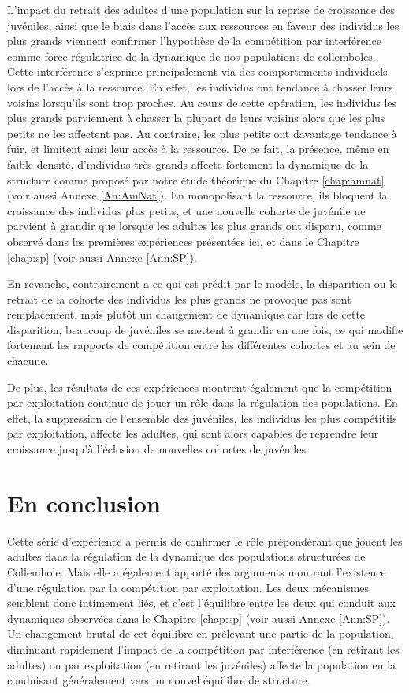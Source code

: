 L'impact du retrait des adultes d'une population sur la reprise de croissance
des juvéniles, ainsi que le biais dans l'accès aux ressources en faveur des
individus les plus grands viennent confirmer l'hypothèse de la compétition par
interférence comme force régulatrice de la dynamique de nos populations de
collemboles. Cette interférence s'exprime principalement via des comportements
individuels lors de l'accès à la ressource. En effet, les individus ont tendance
à chasser leurs voisins lorsqu'ils sont trop proches. Au cours de cette
opération, les individus les plus grands parviennent à chasser la plupart de
leurs voisins alors que les plus petits ne les affectent pas. Au contraire, les plus petits
ont davantage tendance à fuir, et limitent ainsi leur accès à la ressource. De
ce fait, la présence, même en faible densité, d'individus très grands affecte
fortement la dynamique de la structure comme proposé par notre étude théorique
du Chapitre \ref{chap:amnat} (voir aussi Annexe \ref{An:AmNat}). En monopolisant
la ressource, ils bloquent la croissance des individus plus petits, et une nouvelle cohorte de juvénile ne
parvient à grandir que lorsque les adultes les plus grands ont disparu, comme
observé dans les premières expériences présentées ici, et dans le Chapitre
\ref{chap:sp} (voir aussi Annexe \ref{Ann:SP}).

En revanche, contrairement a ce qui est prédit par le modèle, la disparition
ou le retrait de la cohorte des individus les plus grands ne provoque pas sont
remplacement, mais plutôt un changement de dynamique car lors de cette
disparition, beaucoup de juvéniles se mettent à grandir en une fois, ce qui
modifie fortement les rapports de compétition entre les différentes cohortes et
au sein de chacune.

De plus, les résultats de ces expériences montrent également que la compétition
par exploitation continue de jouer un rôle dans la régulation des populations.
En effet, la suppression de l'ensemble des juvéniles, les individus les plus
compétitifs par exploitation, affecte les adultes, qui sont alors capables de
reprendre leur croissance jusqu'à l'éclosion de nouvelles cohortes de juvéniles.

\section{En conclusion}

Cette série d'expérience a permis de confirmer le rôle
prépondérant que jouent les adultes dans la régulation de la dynamique des
populations structurées de Collembole. Mais elle a également apporté des
arguments montrant l'existence d'une régulation par la compétition par
exploitation. Les deux mécanismes semblent donc intimement liés, et c'est
l'équilibre entre les deux qui conduit aux dynamiques observées dans le Chapitre
\ref{chap:sp} (voir aussi Annexe \ref{Ann:SP}). Un changement brutal de cet
équilibre en prélevant une partie de la population, diminuant rapidement l'impact de la compétition par interférence
(en retirant les adultes) ou par exploitation (en retirant les juvéniles)
affecte la population en la conduisant généralement vers un nouvel équilibre de
structure. 

